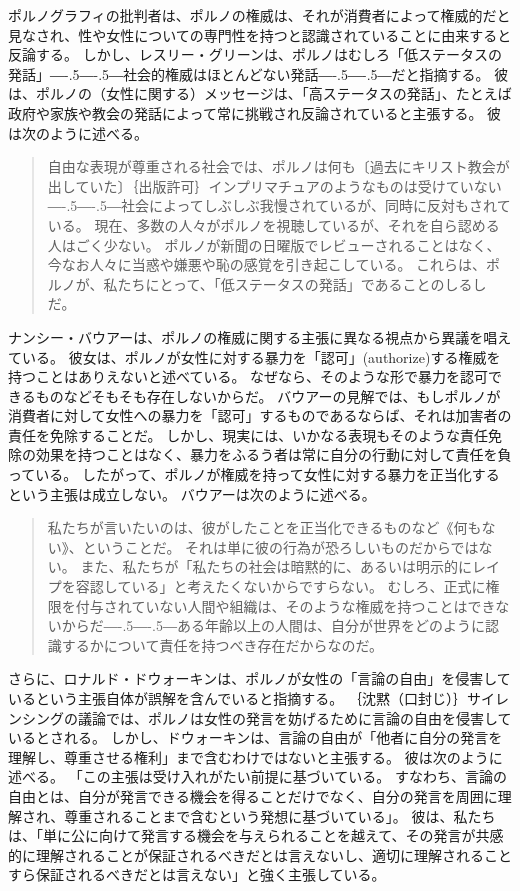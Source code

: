 \documentclass[paper=a4,book,openany]{jlreq}
\newcommand{\ig}[1]{}           %
\def\DDASH{―\kern-.5\zw―\kern-.5\zw―} %
\begin{document}
ポルノグラフィの批判者は、ポルノの権威は、それが消費者によって権威的だと見なされ、性や女性についての専門性を持つと認識されていることに由来すると反論する\citep[p.430]{langton12:_respon}。
しかし、レスリー・グリーン\ig{Leslie Green}は、ポルノはむしろ「低ステータスの発話」{\DDASH}社会的権威はほとんどない発話{\DDASH}だと指摘する。
彼は、ポルノの（女性に関する）メッセージは、「高ステータスの発話」、たとえば政府や家族や教会の発話によって常に挑戦され反論されていると主張する。
彼は次のように述べる。

\begin{quote}
自由な表現が尊重される社会では、ポルノは何も〔過去にキリスト教会が出していた〕｛出版許可｝{インプリマチュア}のようなものは受けていない{\DDASH}社会によってしぶしぶ我慢されているが、同時に反対もされている。
現在、多数の人々がポルノを視聴しているが、それを自ら認める人はごく少ない。
ポルノが新聞の日曜版でレビューされることはなく、今なお人々に当惑や嫌悪や恥の感覚を引き起こしている。
これらは、ポルノが、私たちにとって、「低ステータスの発話」であることのしるしだ。
\citep[pp.296--297]{green98:_pornog_subor_silen}
\end{quote}

ナンシー・バウアーは、ポルノの権威に関する主張に異なる視点から異議を唱えている。
彼女は、ポルノが女性に対する暴力を「認可」(authorize)する権威を持つことはありえないと述べている。
なぜなら、そのような形で暴力を認可できるものなどそもそも存在しないからだ。
バウアーの見解では、もしポルノが消費者に対して女性への暴力を「認可」するものであるならば、それは加害者の責任を免除することだ。
しかし、現実には、いかなる表現もそのような責任免除の効果を持つことはなく、暴力をふるう者は常に自分の行動に対して責任を負っている。
したがって、ポルノが権威を持って女性に対する暴力を正当化するという主張は成立しない。
バウアーは次のように述べる。

\begin{quote}
私たちが言いたいのは、彼がしたことを正当化できるものなど《何もない》、ということだ。
それは単に彼の行為が恐ろしいものだからではない。
また、私たちが「私たちの社会は暗黙的に、あるいは明示的にレイプを容認している」と考えたくないからですらない。
むしろ、正式に権限を付与されていない人間や組織は、そのような権威を持つことはできないからだ{\DDASH}ある年齢以上の人間は、自分が世界をどのように認識するかについて責任を持つべき存在だからなのだ。
\citep[pp.86--87]{bauer06:_how_do_thing_pornog}
\end{quote}

さらに、ロナルド・ドウォーキン\ig{Ronald Dworkin}は、ポルノが女性の「言論の自由」を侵害しているという主張自体が誤解を含んでいると指摘する。
｛沈黙（口封じ）｝{サイレンシング}の議論では、ポルノは女性の発言を妨げるために言論の自由を侵害しているとされる。
しかし、ドウォーキン\ig{Ronald Dworkin}は、言論の自由が「他者に自分の発言を理解し、尊重させる権利」まで含むわけではないと主張する。
彼は次のように述べる。
「この主張は受け入れがたい前提に基づいている。
すなわち、言論の自由とは、自分が発言できる機会を得ることだけでなく、自分の発言を周囲に理解され、尊重されることまで含むという発想に基づいている」。
彼は、私たちは、「単に公に向けて発言する機会を与えられることを越えて、その発言が共感的に理解されることが保証されるべきだとは言えないし、適切に理解されることすら保証されるべきだとは言えない」と強く主張している\citep[p.232]{dworkin96:_freed_law}。
\end{document}

